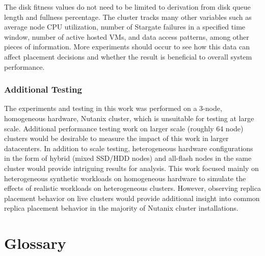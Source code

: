 \documentclass[12pt]{article}
\begin{document}
    The disk fitness values do not need to be limited to derivation from disk
    queue length and fullness percentage. The cluster tracks many other variables
    such as average node CPU utilization, number of Stargate failures in a
    specified time window, number of active hosted VMs, and data access
    patterns, among other pieces of information. More experiments should occur
    to see how this data can affect placement decisions and whether the result
    is beneficial to overall system performance.
    
    \subsubsection{Additional Testing}

    The experiments and testing in this work was performed on a 3-node,
    homogeneous hardware, Nutanix cluster, which is unsuitable for testing at
    large scale. Additional performance testing work on larger scale (roughly 64 node)
    clusters would be desirable to measure the impact of this work in larger
    datacenters. In addition to scale testing, heterogeneous hardware
    configurations in the form of hybrid (mixed SSD/HDD nodes) and all-flash
    nodes in the same cluster would provide intriguing results for analysis.
    This work focused mainly on heterogeneous synthetic workloads on
    homogeneous hardware to simulate the effects of realistic workloads on
    heterogeneous clusters. However, observing replica placement behavior on
    live clusters would provide additional insight into common replica
    placement behavior in the majority of Nutanix cluster installations.


\newpage
\section*{Glossary}
\thispagestyle{empty}
\end{document}
